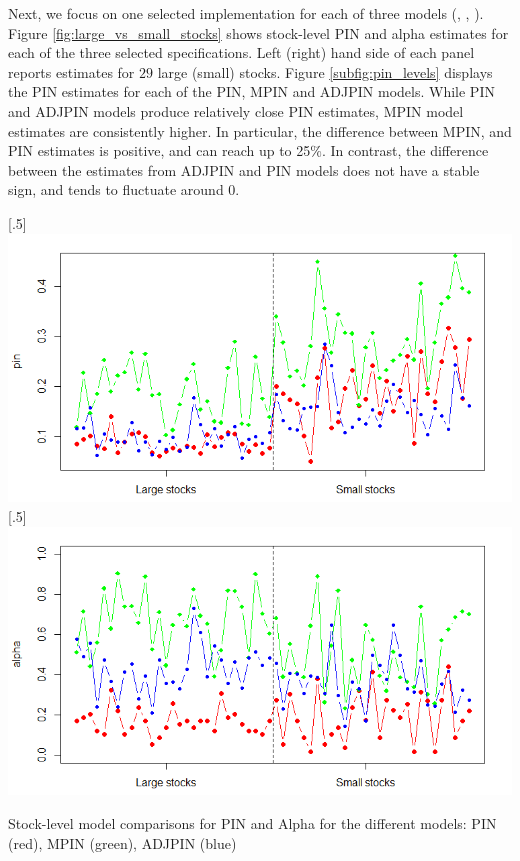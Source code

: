 Next, we focus on one selected implementation for each of three models (, , ). Figure \ref{fig:large_vs_small_stocks} shows stock-level PIN and alpha estimates for each of the three selected specifications. Left (right) hand side of each panel reports estimates for $29$ large (small) stocks. Figure \ref{subfig:pin_levels} displays the PIN estimates for each of the PIN, MPIN and ADJPIN models. While PIN and ADJPIN models produce relatively close PIN estimates, MPIN model estimates are consistently higher. In particular, the difference between MPIN, and PIN estimates is positive, and can reach up to 25$\%$. In contrast, the difference between the estimates from ADJPIN and PIN models does not have a stable sign, and tends to fluctuate around $0$. 

\begin{widefigure}[H]
    \centering
[.5\textwidth]{\includegraphics[width=\linewidth]{images/app1-pin_small_large_stocks.png}}%
[.5\textwidth]{\includegraphics[width=\linewidth]{images/app1-alpha_small_large_stocks.png}}
\caption{Stock-level model comparisons for PIN and Alpha for the different models: PIN (red), MPIN (green), ADJPIN (blue)}
\label{fig:large_vs_small_stocks}
\end{widefigure}


